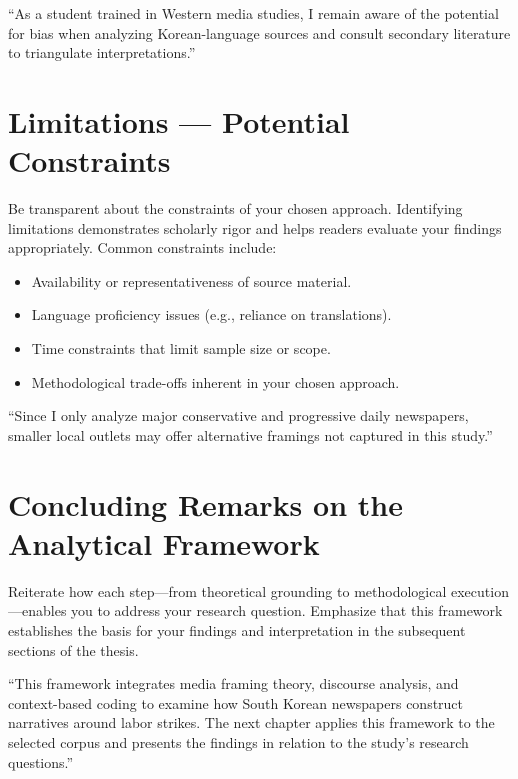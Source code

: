\documentclass[11pt,a4paper]{article}
\begin{document}
\begin{examplebox}
``As a student trained in Western media studies, I remain aware of the potential for bias when analyzing Korean-language sources and consult secondary literature to triangulate interpretations.''
\end{examplebox}

\section{Limitations --- Potential Constraints}

Be transparent about the constraints of your chosen approach. Identifying limitations demonstrates scholarly rigor and helps readers evaluate your findings appropriately. Common constraints include:

\begin{itemize}[nosep]
  \item Availability or representativeness of source material.
  \item Language proficiency issues (e.g., reliance on translations).
  \item Time constraints that limit sample size or scope.
  \item Methodological trade-offs inherent in your chosen approach.
\end{itemize}

\begin{examplebox}
``Since I only analyze major conservative and progressive daily newspapers, smaller local outlets may offer alternative framings not captured in this study.''
\end{examplebox}

\section{Concluding Remarks on the Analytical Framework}

Reiterate how each step---from theoretical grounding to methodological execution---enables you to address your research question. Emphasize that this framework establishes the basis for your findings and interpretation in the subsequent sections of the thesis.

\begin{examplebox}
``This framework integrates media framing theory, discourse analysis, and context-based coding to examine how South Korean newspapers construct narratives around labor strikes. The next chapter applies this framework to the selected corpus and presents the findings in relation to the study's research questions.''
\end{examplebox}
\end{document}
